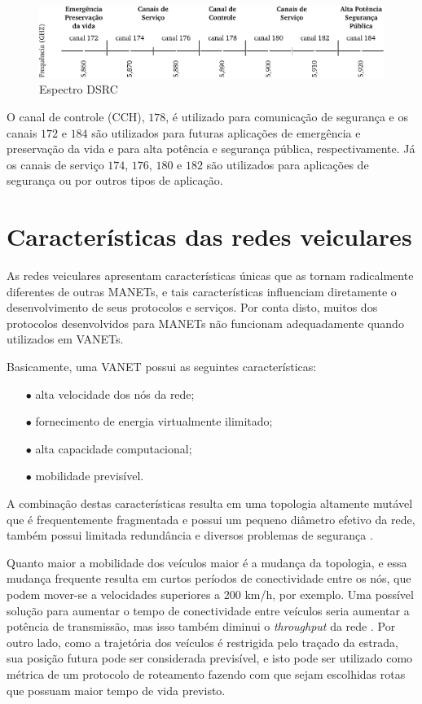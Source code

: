 \begin{figure}[htbp]
\centering
 \includegraphics[width=.95\textwidth]{chapters/fig/dsrc.pdf}
\caption{Espectro DSRC}
\label{fig:dsrc}
\end{figure}

O canal de controle (CCH), $178$, é utilizado para comunicação de segurança e
os canais $172$ e $184$ são utilizados para futuras aplicações de emergência e
preservação da vida e para alta potência e segurança pública, respectivamente.
Já os canais de serviço $174$, $176$, $180$ e $182$ são utilizados para
aplicações de segurança ou por outros tipos de aplicação.


\section{Características das redes veiculares}

As redes veiculares apresentam características únicas que as tornam
radicalmente diferentes \cite{blum2004challenges} de outras MANETs, e
tais características influenciam diretamente o desenvolvimento de
seus protocolos e serviços. Por conta disto, muitos dos protocolos
desenvolvidos para MANETs não funcionam adequadamente quando utilizados
em VANETs.

Basicamente, uma VANET possui as seguintes características:
\begin{enumerate}
  \item[$\bullet$] alta velocidade dos nós da rede;
  \item[$\bullet$] fornecimento de energia virtualmente ilimitado;
  \item[$\bullet$] alta capacidade computacional;
  \item[$\bullet$] mobilidade previsível.
\end{enumerate}

A combinação destas características resulta em uma topologia altamente
mutável que é frequentemente fragmentada e possui um pequeno diâmetro
efetivo da rede, também possui limitada redundância e diversos problemas
de segurança \cite{raya2006securing, dotzer2006privacy, golle2004detecting}.

Quanto maior a mobilidade dos veículos maior é a mudança da topologia,
e essa mudança frequente resulta em curtos períodos de conectividade
entre os nós, que podem mover-se a velocidades superiores a 200 km/h,
por exemplo. Uma possível solução para aumentar o tempo de conectividade
entre veículos seria aumentar a potência de transmissão, mas isso também
diminui o \textit{throughput} da rede \cite{khorashadi2007impact,chen2007impact}.
Por outro lado, como a trajetória dos veículos é restrigida pelo traçado
da estrada, sua posição futura pode ser considerada previsível, e isto pode
ser utilizado como métrica de um protocolo de roteamento fazendo com que
sejam escolhidas rotas que possuam maior tempo de vida previsto.

